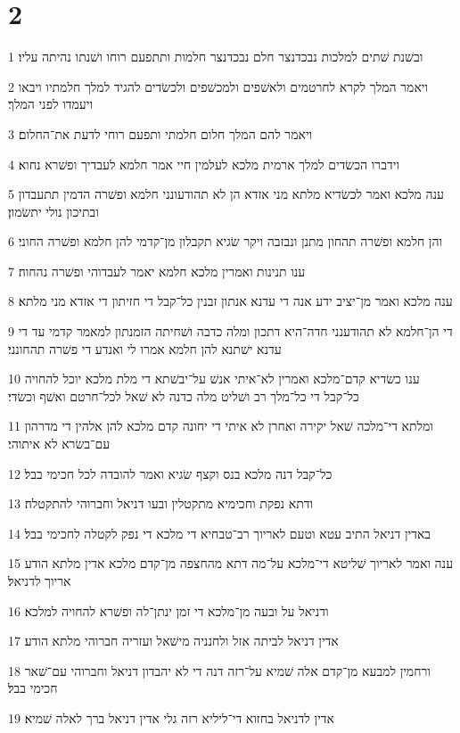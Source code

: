 \chapter{2}

\par 1 ובשׁנת שׁתים למלכות נבכדנצר חלם נבכדנצר חלמות ותתפעם רוחו ושׁנתו נהיתה עליו׃
\par 2 ויאמר המלך לקרא לחרטמים ולאשׁפים ולמכשׁפים ולכשׂדים להגיד למלך חלמתיו ויבאו ויעמדו לפני המלך׃
\par 3 ויאמר להם המלך חלום חלמתי ותפעם רוחי לדעת את־החלום׃
\par 4 וידברו הכשׂדים למלך ארמית מלכא לעלמין חיי אמר חלמא לעבדיך ופשׁרא נחוא׃
\par 5 ענה מלכא ואמר לכשׂדיא מלתא מני אזדא הן לא תהודעונני חלמא ופשׁרה הדמין תתעבדון ובתיכון נולי יתשׂמון׃
\par 6 והן חלמא ופשׁרה תהחון מתנן ונבזבה ויקר שׂגיא תקבלון מן־קדמי להן חלמא ופשׁרה החוני׃
\par 7 ענו תנינות ואמרין מלכא חלמא יאמר לעבדוהי ופשׁרה נהחוה׃
\par 8 ענה מלכא ואמר מן־יציב ידע אנה די עדנא אנתון זבנין כל־קבל די חזיתון די אזדא מני מלתא׃
\par 9 די הן־חלמא לא תהודענני חדה־היא דתכון ומלה כדבה ושׁחיתה הזמנתון למאמר קדמי עד די עדנא ישׁתנא להן חלמא אמרו לי ואנדע די פשׁרה תהחונני׃
\par 10 ענו כשׂדיא קדם־מלכא ואמרין לא־איתי אנשׁ על־יבשׁתא די מלת מלכא יוכל להחויה כל־קבל די כל־מלך רב ושׁליט מלה כדנה לא שׁאל לכל־חרטם ואשׁף וכשׂדי׃
\par 11 ומלתא די־מלכה שׁאל יקירה ואחרן לא איתי די יחונה קדם מלכא להן אלהין די מדרהון עם־בשׂרא לא איתוהי׃
\par 12 כל־קבל דנה מלכא בנס וקצף שׂגיא ואמר להובדה לכל חכימי בבל׃
\par 13 ודתא נפקת וחכימיא מתקטלין ובעו דניאל וחברוהי להתקטלה׃
\par 14 באדין דניאל התיב עטא וטעם לאריוך רב־טבחיא די מלכא די נפק לקטלה לחכימי בבל׃
\par 15 ענה ואמר לאריוך שׁליטא די־מלכא על־מה דתא מהחצפה מן־קדם מלכא אדין מלתא הודע אריוך לדניאל׃
\par 16 ודניאל על ובעה מן־מלכא די זמן ינתן־לה ופשׁרא להחויה למלכא׃
\par 17 אדין דניאל לביתה אזל ולחנניה מישׁאל ועזריה חברוהי מלתא הודע׃
\par 18 ורחמין למבעא מן־קדם אלה שׁמיא על־רזה דנה די לא יהבדון דניאל וחברוהי עם־שׁאר חכימי בבל׃
\par 19 אדין לדניאל בחזוא די־ליליא רזה גלי אדין דניאל ברך לאלה שׁמיא׃
